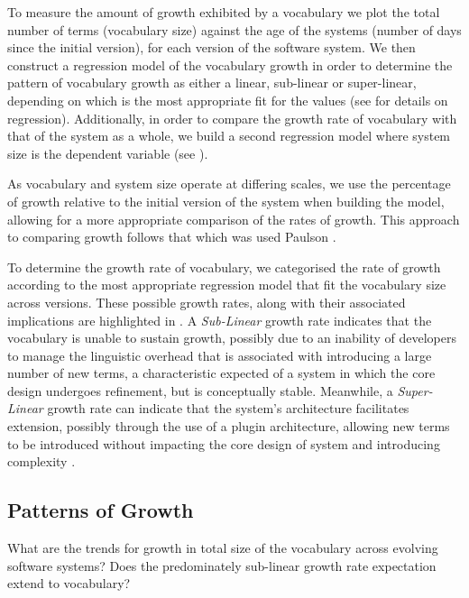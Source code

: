 To measure the amount of growth exhibited by a vocabulary we plot the total number of terms (\ie vocabulary size) against the age of the systems (\ie number of days since the initial version), for each version of the software system. We then construct a regression model of the vocabulary growth in order to determine the pattern of vocabulary growth as either a linear, sub-linear or super-linear, depending on which is the most appropriate fit for the values (see \cite{Draper98a} for details on regression). Additionally, in order to compare the growth rate of vocabulary with that of the system as a whole, we build a second regression model where system size is the dependent variable (see ).

As vocabulary and system size operate at differing scales, we use the percentage of growth relative to the initial version of the system when building the model, allowing for a more appropriate comparison of the rates of growth. This approach to comparing growth follows that which was used Paulson \etal \cite{Paulson04a}.

To determine the growth rate of vocabulary, we categorised the rate of growth according to the most appropriate regression model that fit the vocabulary size across versions. These possible growth rates, along with their associated implications are highlighted in . A \emph{Sub-Linear} growth rate indicates that the vocabulary is unable to sustain growth, possibly due to an inability of developers to manage the linguistic overhead that is associated with introducing a large number of new terms, a characteristic expected of a system in which the core design undergoes refinement, but is conceptually stable. Meanwhile, a \emph{Super-Linear} growth rate can indicate that the system's architecture facilitates extension, possibly through the use of a plugin architecture, allowing new terms to be introduced without impacting the core design of system and introducing complexity \cite{Godfrey01a}.


\subsection{Patterns of Growth} %
\label{sub:patterns_of_growth}

What are the trends for growth in total size of the vocabulary across evolving software systems? Does the predominately sub-linear growth rate expectation extend to vocabulary?

